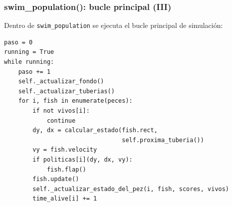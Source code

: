 \documentclass[
	11pt, %
]{beamer}
\begin{document}
\begin{frame}[fragile]
\frametitle{swim\_population(): bucle principal (III)}

Dentro de \texttt{swim\_population} se ejecuta el bucle principal de simulación:

{\scriptsize
\begin{verbatim}
paso = 0
running = True
while running:
    paso += 1
    self._actualizar_fondo()
    self._actualizar_tuberias()
    for i, fish in enumerate(peces):
        if not vivos[i]:
            continue
        dy, dx = calcular_estado(fish.rect,
                                 self.proxima_tuberia())
        vy = fish.velocity
        if politicas[i](dy, dx, vy):
            fish.flap()
        fish.update()
        self._actualizar_estado_del_pez(i, fish, scores, vivos)
        time_alive[i] += 1
\end{verbatim}
}


\end{frame}

\end{document}
